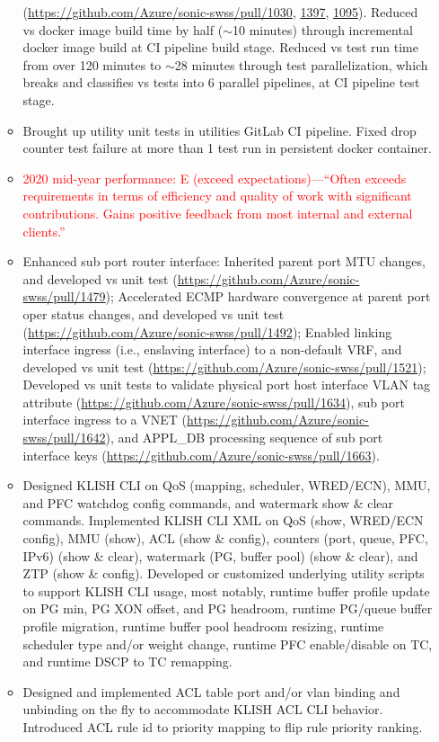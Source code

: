 \documentclass[letterpaper,11pt]{article}
\newcommand{\resitem}[1]{\item #1 \vspace{-2pt}}
\begin{document}
\begin{itemize}
\begin{itemize}
{  (\url{https://github.com/Azure/sonic-swss/pull/1030}, \url{1397}, \url{1095}).
  Reduced vs docker image build time by half ({\tt $\sim$}10 minutes) through incremental docker image build at CI pipeline build stage.
  Reduced vs test run time from over 120 minutes to {\tt $\sim$}28 minutes through test parallelization,
  which breaks and classifies vs tests into 6 parallel pipelines, at CI pipeline test stage.}
  \resitem{Brought up utility unit tests in utilities GitLab CI pipeline.
  Fixed drop counter test failure at more than 1 test run in persistent docker container.}
  \resitem{\textcolor{Red}{2020 mid-year performance: E (exceed expectations)---``Often exceeds requirements in terms of efficiency and quality of work
  with significant contributions. Gains positive feedback from most internal and external clients.''}}
  \resitem{Enhanced sub port router interface: Inherited parent port MTU changes, and developed vs unit test
  (\url{https://github.com/Azure/sonic-swss/pull/1479});
  Accelerated ECMP hardware convergence at parent port oper status changes, and developed vs unit test
  (\url{https://github.com/Azure/sonic-swss/pull/1492});
  Enabled linking interface ingress (i.e., enslaving interface) to a non-default VRF, and developed vs unit test
  (\url{https://github.com/Azure/sonic-swss/pull/1521});
  Developed vs unit tests to validate physical port host interface VLAN tag attribute 
  (\url{https://github.com/Azure/sonic-swss/pull/1634}),
  sub port interface ingress to a VNET (\url{https://github.com/Azure/sonic-swss/pull/1642}),
  and APPL\_DB processing sequence of sub port interface keys (\url{https://github.com/Azure/sonic-swss/pull/1663}).}
  \resitem{Designed KLISH CLI on QoS (mapping, scheduler, WRED/ECN), MMU, and PFC watchdog config commands, and watermark show \& clear commands. 
  Implemented KLISH CLI XML on QoS (show, WRED/ECN config), MMU (show), ACL (show \& config),
  counters (port, queue, PFC, IPv6) (show \& clear), watermark (PG, buffer pool) (show \& clear), and ZTP (show \& config).
  Developed or customized underlying utility scripts to support KLISH CLI usage, most notably,
  runtime buffer profile update on PG min, PG XON offset, and PG headroom,
  runtime PG/queue buffer profile migration,
  runtime buffer pool headroom resizing,
  runtime scheduler type and/or weight change,
  runtime PFC enable/disable on TC,
  and runtime DSCP to TC remapping.}
  \resitem{Designed and implemented ACL table port and/or vlan binding and unbinding on the fly to accommodate KLISH ACL CLI behavior.
  Introduced ACL rule id to priority mapping to flip rule priority ranking.
}
\end{itemize}
\end{itemize}
\end{document}
